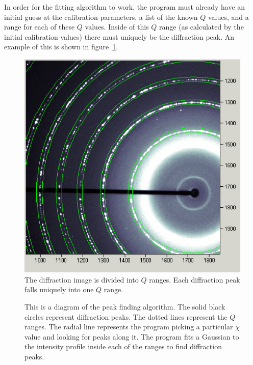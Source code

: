 In order for the fitting algorithm to work, the program 
must already have an initial guess at the calibration 
parameters, a list of the known $Q$ values, and 
a range for each of these $Q$ values. Inside of this 
$Q$ range (as 
calculated by the initial calibration values) there 
must uniquely be the diffraction peak.
An example of this is shown in figure~\ref{divide_up_image}.

\begin{figure}
    \centering
    \includegraphics[scale=.75]
    {figures/constant_dq_lines_on_diffraction_image.eps}
    \caption{The diffraction image is divided into
    $Q$ ranges. Each diffraction peak falls
    uniquely into one $Q$ range.}
    \label{divide_up_image}
\end{figure}

\begin{figure}
    \centering
    
    \caption{This is a diagram of the peak finding algorithm. 
    The solid black circles represent diffraction peaks. The 
    dotted lines represent the $Q$ ranges. The radial line
    represents the program picking a 
    particular $\chi$ value and looking for peaks along it.
    The program fits a Gaussian to the intensity 
    profile inside each of the ranges to find diffraction 
    peaks.}
    \label{fitting}
\end{figure}

